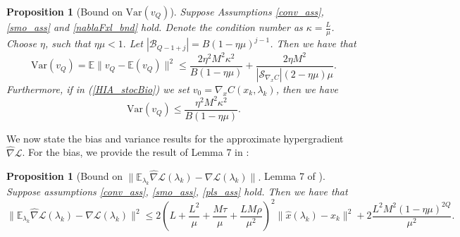 \documentclass[11pt, twoside]{report}
\newtheorem{proposition}[theorem]{Proposition}
\begin{document}
\begin{proposition}[Bound on $\mathrm{Var}(v_Q)$] \label{varvq_better}
Suppose Assumptions \ref{conv_ass}, \ref{smo_ass} and \ref{nablaFxl_bnd} hold. Denote the condition number as $\kappa = \frac{L}{\mu}$. Choose $\eta$, such that $\eta \mu < 1.$ Let $|\mathcal{B}_{Q-1+j}| = B(1-\eta\mu)^{j-1}$. Then we have that
    \[\mathrm{Var}(v_Q) = \mathbb{E}\|v_Q - \mathbb{E}(v_Q)\|^2 \leq   \frac{2 \eta^2M^2 \kappa^2 }{B(1-\eta\mu)} + \frac{2 \eta M^2}{|\mathcal{S}_{\nabla_x C}| (2 - \eta \mu)\mu}.\]
    Furthermore, if in (\ref{HIA_stocBio}) we set $v_0 = \nabla_x C(x_k,\lambda_k)$, then we have
    \[\mathrm{Var}(v_Q) \leq   \frac{\eta^2M^2 \kappa^2 }{B(1-\eta\mu)}.\]
\end{proposition}

We now state the bias and variance results for the approximate hypergradient $\widehat{\nabla} \mathcal{L}$. For the bias, we provide the result of Lemma 7 in \cite{ji2021bilevel}:
\begin{proposition}[Bound on $\|\mathbb{E}_{\lambda_k} \widehat{\nabla} \mathcal{L}(\lambda_k) - \nabla \mathcal{L}(\lambda_k)\|.$ Lemma 7 of \cite{ji2021bilevel}] \label{nabla_hat_nabla_bnd}
Suppose assumptions \ref{conv_ass}, \ref{smo_ass}, \ref{pls_ass} hold. Then we have that 
\[\|\mathbb{E}_{\lambda_k} \widehat{\nabla} \mathcal{L}(\lambda_k) - \nabla \mathcal{L}(\lambda_k)\|^2 \leq 2\left(L + \frac{L^2}{\mu} + \frac{M\tau}{\mu} + \frac{LM\rho}{\mu^2} \right)^2 \|\hat{x}(\lambda_k) - x_k\|^2 + 2 \frac{L^2M^2(1-\eta \mu)^{2Q}}{\mu^2}.\]
\end{proposition}
\end{document}
